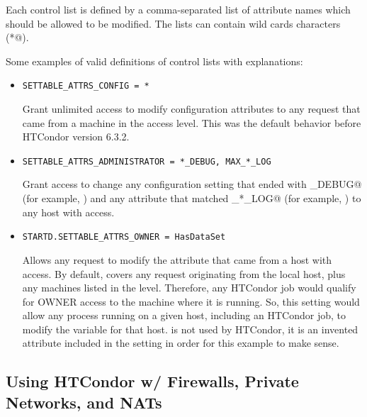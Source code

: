 Each control list is defined by a comma-separated list of attribute
names which should be allowed to be modified.
The lists can contain wild cards characters (\verb@*@). 

Some examples of valid definitions of control lists with explanations:

\begin{itemize}

\item \begin{verbatim}SETTABLE_ATTRS_CONFIG = *\end{verbatim}
Grant unlimited access to modify configuration attributes
to any request that came from a machine in the  access
level. 
This was the default behavior before HTCondor version 6.3.2.

\item \begin{verbatim}SETTABLE_ATTRS_ADMINISTRATOR = *_DEBUG, MAX_*_LOG\end{verbatim} 
Grant access to change any configuration setting that ended
with \verb@_DEBUG@ (for example, ) and any
attribute that matched \verb@MAX_*_LOG@ (for example,
) to any host with 
access. 

\item \begin{verbatim}STARTD.SETTABLE_ATTRS_OWNER = HasDataSet\end{verbatim}
Allows any request to modify the  
attribute that came from a host with  access.
By default,  covers any request originating from the
local host, plus any machines listed in the 
level.
Therefore, any HTCondor job would qualify for OWNER access to the
machine where it is running. 
So, this setting would allow any process running on a given host,
including an HTCondor job, to modify the  variable for
that host. 
 is not used by HTCondor, it is an invented attribute
included in the  setting in order for this
example to make sense.

\end{itemize}

\subsection{\label{sec:security-networks}Using 
HTCondor w/ Firewalls, Private Networks, and NATs}

